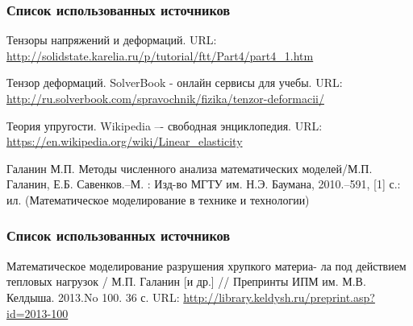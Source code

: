 \documentclass[unicode]{beamer}
\begin{document}
    \begin{frame}
        \frametitle{Список использованных источников}
        \begin{thebibliography}{9}
             Тензоры напряжений и деформаций. URL: \url{http://solidstate.karelia.ru/p/tutorial/ftt/Part4/part4_1.htm}

             Тензор деформаций. SolverBook - онлайн сервисы для учебы. URL: \url{http://ru.solverbook.com/spravochnik/fizika/tenzor-deformacii/}

             Теория упругости. Wikipedia –- свободная энциклопедия. URL: \url{https://en.wikipedia.org/wiki/Linear_elasticity}

              Галанин М.П. Методы численного анализа математических моделей/М.П. Галанин, Е.Б. Савенков.–М. : Изд-во МГТУ им. Н.Э. Баумана, 2010.–591, [1] с.: ил. (Математическое моделирование в технике и технологии)

        \end{thebibliography}
    \end{frame}

    \begin{frame}
        \frametitle{Список использованных источников}
        \begin{thebibliography}{9}

             Математическое моделирование разрушения хрупкого материа- ла под действием тепловых нагрузок / М.П. Галанин [и др.] // Препринты ИПМ им. М.В. Келдыша. 2013.No 100. 36 с. URL: \url{http://library.keldysh.ru/preprint.asp?id=2013-100}
        \end{thebibliography}
    \end{frame}
    
\end{document}

